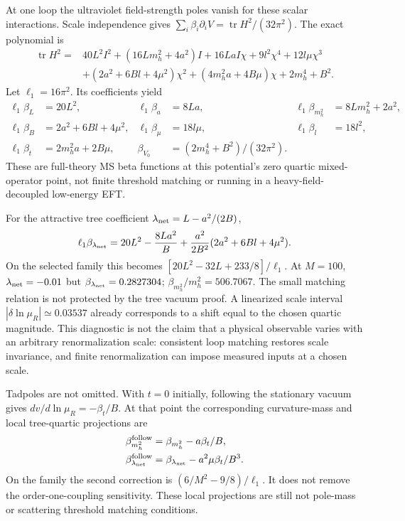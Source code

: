 \documentclass[11pt]{article}
\begin{document}
At one loop the ultraviolet field-strength poles vanish for these scalar
interactions. Scale independence gives
$\sum_i\beta_i\partial_i V=\operatorname{tr}H^2/(32\pi^2)$.
The exact polynomial is
\begin{align}
 \operatorname{tr}H^2={}&40L^2I^2+(16Lm_h^2+4a^2)I+16LaI\chi
 +9l^2\chi^4+12l\mu\chi^3\nonumber\\
 &+(2a^2+6Bl+4\mu^2)\chi^2
 +(4m_h^2a+4B\mu)\chi+2m_h^4+B^2.
 \label{qfg:trace}
\end{align}
Let $\ell_1=16\pi^2$. Its coefficients yield
\begin{align}
 \ell_1\beta_L&=20L^2,&\ell_1\beta_a&=8La,
 &\ell_1\beta_{m_h^2}&=8Lm_h^2+2a^2,\\
 \ell_1\beta_B&=2a^2+6Bl+4\mu^2,
 &\ell_1\beta_\mu&=18l\mu,&\ell_1\beta_l&=18l^2,\\
 \ell_1\beta_t&=2m_h^2a+2B\mu,
 &\beta_{V_0}&=(2m_h^4+B^2)/(32\pi^2).
\end{align}
These are full-theory MS beta functions at this potential's zero quartic
mixed-operator point, not finite threshold matching or running in a
heavy-field-decoupled low-energy EFT.

For the attractive tree coefficient $\lambda_{\rm net}=L-a^2/(2B)$,
\begin{equation}
 \ell_1\beta_{\lambda_{\rm net}}
 =20L^2-\frac{8La^2}{B}
 +\frac{a^2}{2B^2}(2a^2+6Bl+4\mu^2).
\end{equation}
On the selected family this becomes
$[20L^2-32L+233/8]/\ell_1$.
At $M=100$, $\lambda_{\rm net}=-0.01$ but
$\beta_{\lambda_{\rm net}}=0.2827304$;
$\beta_{m_h^2}/m_h^2=506.7067$. The small matching relation is not protected
by the tree vacuum proof. A linearized scale interval
$|\delta\ln\mu_R|\simeq0.03537$ already corresponds to a shift equal to
the chosen quartic magnitude. This diagnostic is not the claim that a
physical observable varies with an arbitrary renormalization scale:
consistent loop matching restores scale invariance, and finite
renormalization can impose measured inputs at a chosen scale.

Tadpoles are not omitted. With $t=0$ initially, following the stationary
vacuum gives $dv/d\ln\mu_R=-\beta_t/B$. At that point the corresponding
curvature-mass and local tree-quartic projections are
\begin{align}
 \beta_{m_h^2}^{\rm follow}&=\beta_{m_h^2}-a\beta_t/B,\\
 \beta_{\lambda_{\rm net}}^{\rm follow}
 &=\beta_{\lambda_{\rm net}}-a^2\mu\beta_t/B^3.
\end{align}
On the family the second correction is
$(6/M^2-9/8)/\ell_1$. It does not remove the order-one-coupling sensitivity.
These local projections are still not pole-mass or scattering threshold
matching conditions.
\end{document}
